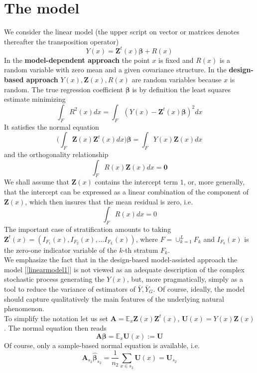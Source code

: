 \documentclass[a4paper,12pt,leqno, titlepage]{article}
\newcommand{\EX}{\mathbb{E}}
\begin{document}
 \section{The model}
 We consider the linear model (the upper script on vector or matrices denotes thereafter the transposition operator)
 \begin{equation}\label{linearmodel1}
 Y(x)=\pmb{Z}^t(x)\pmb{\beta}+ R(x)
 \end{equation}
 In the \textbf{model-dependent approach} the point $x$ is fixed and $R(x)$ is a random variable with zero mean and a given covariance structure. In the \textbf{design-based approach}
  $Y(x), \pmb{Z}(x), R(x)$ are random variables  because $x$ is random. The true regression coefficient $\pmb{\beta}$ is by definition the least squares estimate minimizing
 $$\int_F R^2(x)dx=\int_F(Y(x)-\pmb{Z}^t(x)\pmb{\beta})^2 dx$$
 It satisfies the normal equation
 \begin{equation}\label{normaleq1}
 \Big(\int_F\pmb{Z}(x)\pmb{Z}^t(x)dx\Big)\pmb{\beta}=\int_F Y(x)\pmb{Z}(x)dx
 \end{equation}
 and the orthogonality relationship
 \begin{equation}\label{linearmodel2}
 \int_F R(x)\pmb{Z}(x)dx=\pmb{0}
 \end{equation}
  We shall assume that $\pmb{Z}(x)$ contains the intercept term $1$, or, more generally, that the intercept can be expressed as a linear combination of the component of $\pmb{Z}(x)$, which then insures that the mean residual is zero, i.e.
 $$\int_F R(x)dx=0$$
   The important case of stratification amounts to taking $\pmb{Z}^t(x)=(I_{F_1}(x),I_{F_2}(x),\ldots I_{F_L}(x))$, where $F=\cup_{k=1}^L F_k$ and $I_{F_k}(x)$ is the zero-one indicator variable of the $k$-th stratum $F_k$.\\
    We emphasize the fact that in the design-based model-assisted approach the model [\ref{linearmodel1}] is not viewed as an adequate description of the complex stochastic process generating the $Y(x)$, but, more pragmatically, simply as a tool to reduce the variance of estimators of $\bar{Y}, \bar{Y}_G$. Of course, ideally, the model should capture qualitatively the main features of the underlying natural phenomenon. \\To simplify the notation let us
 set $\pmb{A}=\EX_x\pmb{Z}(x)\pmb{Z}^t(x)$, $\pmb{U}(x)=Y(x)\pmb{Z}(x)$.
 The normal equation then reads
 $$\pmb{A}\pmb{\beta}=\EX_x\pmb{U}(x):=\pmb{U}$$
 Of course, only a sample-based normal equation is available, i.e.
 $$\pmb{A}_{s_2}\hat{\pmb{\beta}}_{s_2}=\frac{1}{n_2}\sum_{x\in{s_2}}\pmb{U}(x)=\pmb{U}_{s_2}$$
\end{document}
